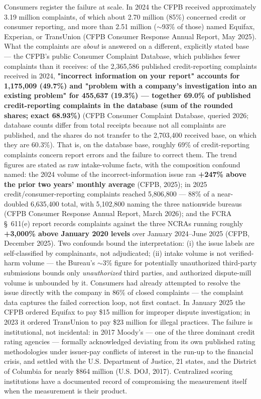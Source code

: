 \documentclass[11pt,twocolumn]{article}
\begin{document}
Consumers register the failure at scale. In 2024 the CFPB received approximately 3.19 million complaints, of which about 2.70 million (85\%) concerned credit or consumer reporting, and more than 2.51 million ($\sim$93\% of those) named Equifax, Experian, or TransUnion (CFPB Consumer Response Annual Report, May 2025). What the complaints are \emph{about} is answered on a different, explicitly stated base --- the CFPB's public Consumer Complaint Database, which publishes fewer complaints than it receives: of the 2,365,586 published credit-reporting complaints received in 2024, \textbf{"incorrect information on your report" accounts for 1,175,009 (49.7\%) and "problem with a company's investigation into an existing problem" for 455,637 (19.3\%) --- together 69.0\% of published credit-reporting complaints in the database (sum of the rounded shares; exact 68.93\%)} (CFPB Consumer Complaint Database, queried 2026; database counts differ from total receipts because not all complaints are published, and the shares do not transfer to the 2,703,400 received base, on which they are 60.3\%). That is, on the database base, roughly 69\% of credit-reporting complaints concern report errors and the failure to correct them. The trend figures are stated as raw intake-volume facts, with the composition confound named: the 2024 volume of the incorrect-information issue ran \textbf{+247\% above the prior two years' monthly average} (CFPB, 2025); in 2025 credit/consumer-reporting complaints reached 5,806,800 --- 88\% of a near-doubled 6,635,400 total, with 5,102,800 naming the three nationwide bureaus (CFPB Consumer Response Annual Report, March 2026); and the FCRA \S~611(e) report records complaints against the three NCRAs running roughly \textbf{+3,000\% above January 2020 levels} over January 2024--June 2025 (CFPB, December 2025). Two confounds bound the interpretation: (i) the issue labels are self-classified by complainants, not adjudicated; (ii) intake volume is not verified-harm volume --- the Bureau's $\sim$3\% figure for potentially unauthorized third-party submissions bounds only \emph{unauthorized} third parties, and authorized dispute-mill volume is unbounded by it. Consumers had already attempted to resolve the issue directly with the company in 86\% of closed complaints --- the complaint data captures the failed correction loop, not first contact. In January 2025 the CFPB ordered Equifax to pay \$15 million for improper dispute investigation; in 2023 it ordered TransUnion to pay \$23 million for illegal practices. The failure is institutional, not incidental: in 2017 Moody's --- one of the three dominant credit rating agencies --- formally acknowledged deviating from its own published rating methodologies under issuer-pay conflicts of interest in the run-up to the financial crisis, and settled with the U.S. Department of Justice, 21 states, and the District of Columbia for nearly \$864 million (U.S. DOJ, 2017). Centralized scoring institutions have a documented record of compromising the measurement itself when the measurement is their product.
\end{document}
